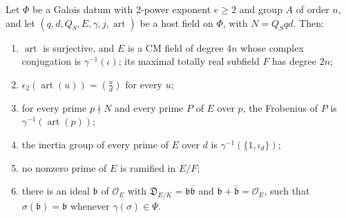 \begin{proposition}\label{hf-host-field-properties}
Let $\Phi$ be a Galois datum with $2$-power exponent $e\geq2$ and group $A$ of order $n$, and let
$(q,d,Q_S,E,\gamma,j,\operatorname{art})$ be a host field on $\Phi$, with $N=Q_Sqd$. Then:
\begin{enumerate}
\item $\operatorname{art}$ is surjective, and $E$ is a CM field of degree $4n$ whose complex
  conjugation is $\gamma^{-1}(\iota)$; its maximal totally real subfield $F$ has degree $2n$;
\item $\epsilon_2(\operatorname{art}(u))=\left(\frac ud\right)$ for every $u$;
\item for every prime $p\nmid N$ and every prime $P$ of $E$ over $p$, the Frobenius of $P$ is
  $\gamma^{-1}(\operatorname{art}(p))$;
\item the inertia group of every prime of $E$ over $d$ is $\gamma^{-1}(\{1,\iota_d\})$;
\item no nonzero prime of $E$ is ramified in $E/F$;
\item there is an ideal $\mathfrak b$ of $\mathcal O_E$ with
  $\mathfrak D_{E/K}=\mathfrak b\bar{\mathfrak b}$ and $\mathfrak b+\bar{\mathfrak b}=\mathcal O_E$,
  such that $\sigma(\mathfrak b)=\mathfrak b$ whenever $\gamma(\sigma)\in\Psi$.
\end{enumerate}
\end{proposition}

